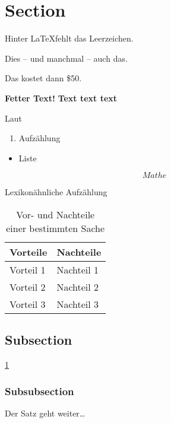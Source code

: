 
\section{Section}

Hinter \LaTeX \@ fehlt das Leerzeichen.

Dies -- und manchmal -- auch das.

Das kostet dann \$50.

\textbf{Fetter Text!}
\bfseries
Text text text
\normalfont %

Laut \cite{nguyen_machine_2018}


\begin{enumerate}
    \item Aufzählung
\end{enumerate}

\begin{itemize}
    \item Liste
\end{itemize}

\begin{equation}
    Mathe
\end{equation}

\begin{description}
    \item[Lexikonähnliche Aufzählung]
\end{description}


\begin{table}[h]
    \centering
    \begin{tabular}{|p{5cm}|p{5cm}|} 
        \hline
        \textbf{Vorteile} & \textbf{Nachteile} \\
        \hline
        Vorteil 1 & Nachteil 1 \\
        Vorteil 2 & Nachteil 2 \\
        Vorteil 3 & Nachteil 3 \\
        \hline
    \end{tabular}
    \caption{Vor- und Nachteile einer bestimmten Sache}
    \label{tab:beispiel}
\end{table}



    \subsection{Subsection}
    \lipsum[1]
    \ref{tab:beispiel}
    
        \subsubsection{Subsubsection}
        \lipsum[1] Der Satz geht weiter\dots
